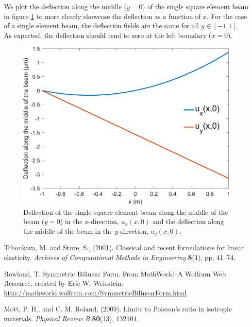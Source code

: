 \documentclass[11pt]{article}
\begin{document}
We plot the deflection along the middle ($y=0$) of the single square element beam in figure \ref{fig:q2a_plot} to more clearly showcase the deflection as a function of $x$. For the case of a single element beam, the deflection fields are the same for all $y \in [-1,1]$. As expected, the deflection should tend to zero at the left boundary ($x=0$).

\begin{figure}[!htb]
	\centering
	\includegraphics[width=0.7\linewidth]{q2a_plot.png}
	\caption{Deflection of the single square element beam along the middle of the beam ($y=0$) in the $x$-direction, $u_x(x,0)$ and the deflection along the middle of the beam in the $y$-direction, $u_y(x,0)$.}
	\label{fig:q2a_plot}
\end{figure}

\clearpage
\begin{thebibliography}{9}
Tchonkova, M. and Sture, S., (2001). Classical and recent formulations for linear elasticity. \textit{Archives of Computational Methods in Engineering} \textbf{8}(1), pp. 41--74.

Rowland, T. Symmetric Bilinear Form. From MathWorld--A Wolfram Web Resource, created by Eric W. Weisstein. \url{http://mathworld.wolfram.com/SymmetricBilinearForm.html}

Mott, P. H., and C. M. Roland, (2009). Limits to Poisson's ratio in isotropic materials. \textit{Physical Review B} \textbf{80}(13), 132104.
\end{thebibliography}
\end{document}
